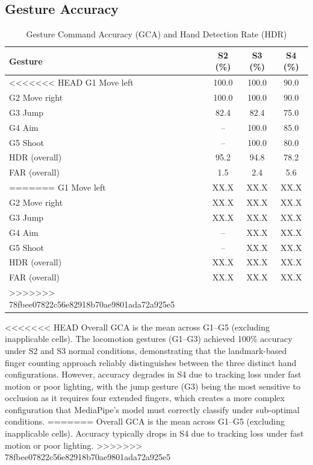 \documentclass[journal,onecolumn,12pt,draftclsnofoot]{IEEEtran}
\begin{document}
\begin{itemize}
\subsection{Gesture Accuracy}
\begin{table}[htbp]
\caption{Gesture Command Accuracy (GCA) and Hand Detection Rate (HDR)}
\centering
\begin{tabular}{|l|c|c|c|}
\hline
\textbf{Gesture} & \textbf{S2 (\%)} & \textbf{S3 (\%)} & \textbf{S4 (\%)} \\
\hline
<<<<<<< HEAD
G1 Move left   & 100.0 & 100.0 & 90.0 \\
G2 Move right  & 100.0 & 100.0 & 90.0 \\
G3 Jump        & 82.4  & 82.4  & 75.0 \\
G4 Aim         & --    & 100.0 & 85.0 \\
G5 Shoot       & --    & 100.0 & 80.0 \\
\hline
HDR (overall)  & 95.2  & 94.8  & 78.2 \\
FAR (overall)  & 1.5   & 2.4   & 5.6 \\
=======
G1 Move left   & XX.X & XX.X & XX.X \\
G2 Move right  & XX.X & XX.X & XX.X \\
G3 Jump        & XX.X & XX.X & XX.X \\
G4 Aim         & --   & XX.X & XX.X \\
G5 Shoot       & --   & XX.X & XX.X \\
\hline
HDR (overall)  & XX.X & XX.X & XX.X \\
FAR (overall)  & XX.X & XX.X & XX.X \\
>>>>>>> 78fbee07822c56e82918b70ae9801ada72a925e5
\hline
\end{tabular}
\label{tab:accuracy}
\end{table}

<<<<<<< HEAD
Overall GCA is the mean across G1--G5 (excluding inapplicable cells). The locomotion gestures (G1--G3) achieved 100\% accuracy under S2 and S3 normal conditions, demonstrating that the landmark-based finger counting approach reliably distinguishes between the three distinct hand configurations. However, accuracy degrades in S4 due to tracking loss under fast motion or poor lighting, with the jump gesture (G3) being the most sensitive to occlusion as it requires four extended fingers, which creates a more complex configuration that MediaPipe's model must correctly classify under sub-optimal conditions.
=======
Overall GCA is the mean across G1--G5 (excluding inapplicable cells). Accuracy typically drops in S4 due to tracking loss under fast motion or poor lighting.
>>>>>>> 78fbee07822c56e82918b70ae9801ada72a925e5


\end{itemize}
\end{document}
